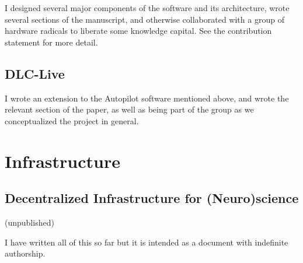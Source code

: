 I designed several major components of the software and its architecture, wrote several sections of the manuscript, and otherwise collaborated with a group of hardware radicals to liberate some knowledge capital. See the contribution statement for more detail.

\subsection{DLC-Live}

\begin{leftbar}
\end{leftbar}

I wrote an extension to the Autopilot software mentioned above, and wrote the relevant section of the paper, as well as being part of the group as we conceptualized the project in general.

\section{Infrastructure}

\subsection{Decentralized Infrastructure for (Neuro)science}

\begin{leftbar}
(unpublished)
\end{leftbar}

I have written all of this so far but it is intended as a document with indefinite authorship.
